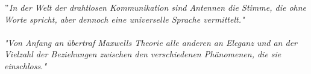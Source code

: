 \vspace*{4cm}
\textit{$"$In der Welt der drahtlosen Kommunikation sind Antennen die Stimme, die ohne Worte spricht, aber dennoch eine universelle Sprache vermittelt."} \\
\newline
{} \\
\vspace{2cm}
\newline
\textit{"Von Anfang an übertraf Maxwells Theorie alle anderen an Eleganz und an der Vielzahl der Beziehungen zwischen den verschiedenen Phänomenen, die sie einschloss."}\\
\newline
{}
\vspace{2cm}


